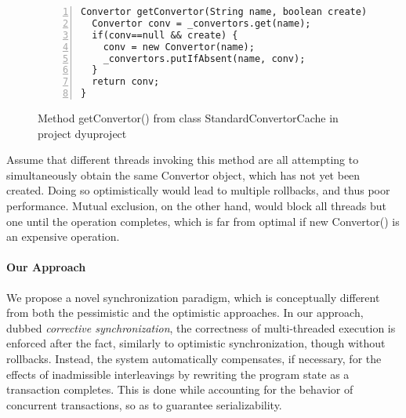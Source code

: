 
\begin{figure}
	\begin{lstlisting}[numbers=left]
Convertor getConvertor(String name, boolean create) {
  Convertor conv = _convertors.get(name);
  if(conv==null && create) {
    conv = new Convertor(name);
    _convertors.putIfAbsent(name, conv);
  }
  return conv;
}
	\end{lstlisting}
	\caption{\label{Fi:introMotivating}Method {\sf getConvertor()} from class {\sf StandardConvertorCache} in project {\sf dyuproject}}
\end{figure}


Assume that different threads invoking this method are all attempting to simultaneously obtain the same {\sf Convertor} object, which has not yet been created. Doing so optimistically would lead to multiple rollbacks, and thus poor performance. Mutual exclusion, on the other hand, would block all threads but one until the operation completes, which is far from optimal if {\sf new Convertor()} is an expensive operation.

\paragraph{Our Approach} We propose a novel synchronization paradigm, which is conceptually different from both the pessimistic and the optimistic approaches. In our approach, dubbed \emph{corrective synchronization}, the correctness of multi-threaded execution is enforced after the fact, similarly to optimistic synchronization, though without rollbacks. Instead, the system automatically compensates, if necessary, for the effects of inadmissible interleavings by rewriting the program state as a transaction completes. This is done while accounting for the behavior of concurrent transactions, so as to guarantee serializability.

